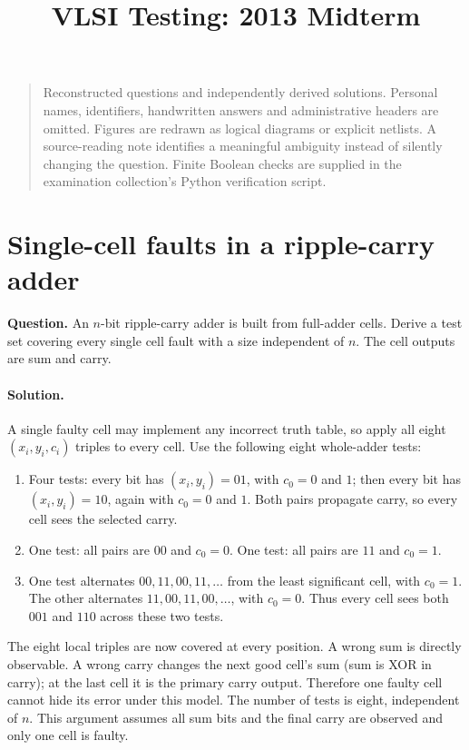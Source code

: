 \documentclass[11pt]{article}
\newcommand{\sol}{\paragraph{Solution.}}
\begin{document}
\title{VLSI Testing: 2013 Midterm}\author{}\date{}\maketitle\begin{quote}\small
Reconstructed questions and independently derived solutions. Personal names, identifiers,
handwritten answers and administrative headers are omitted. Figures are redrawn as
logical diagrams or explicit netlists. A source-reading note identifies a meaningful
ambiguity instead of silently changing the question. Finite Boolean checks
are supplied in the examination collection's Python verification script.
\end{quote}

\section{Single-cell faults in a ripple-carry adder}
\textbf{Question.} An $n$-bit ripple-carry adder is built from full-adder cells.
Derive a test set covering every single cell fault with a size independent of $n$.
The cell outputs are sum and carry.
\begin{center}\end{center}

\sol A single faulty cell may implement any incorrect truth table, so apply all
eight $(x_i,y_i,c_i)$ triples to every cell. Use the following eight whole-adder tests:
\begin{enumerate}
\item Four tests: every bit has $(x_i,y_i)=01$, with $c_0=0$ and $1$;
then every bit has $(x_i,y_i)=10$, again with $c_0=0$ and $1$.
Both pairs propagate carry, so every cell sees the selected carry.
\item One test: all pairs are $00$ and $c_0=0$.
One test: all pairs are $11$ and $c_0=1$.
\item One test alternates $00,11,00,11,\ldots$ from the least significant cell,
with $c_0=1$. The other alternates $11,00,11,00,\ldots$, with $c_0=0$.
Thus every cell sees both $001$ and $110$ across these two tests.
\end{enumerate}
The eight local triples are now covered at every position. A wrong sum is directly
observable. A wrong carry changes the next good cell's sum (sum is XOR in carry);
at the last cell it is the primary carry output. Therefore one faulty cell cannot
hide its error under this model. The number of tests is eight, independent of $n$.
This argument assumes all sum bits and the final carry are observed and only one
cell is faulty.
\end{document}
